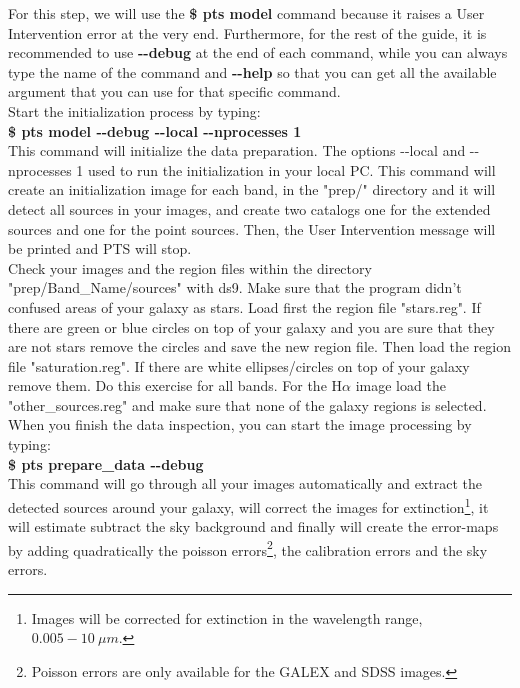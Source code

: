 \documentclass[15pt,a4paper,oneside,openright]{report}
\begin{document}
For this step, we will use the \textbf{\$ pts model} command because it raises a User Intervention error at the very end. Furthermore, for the rest of
the guide, it is recommended to use \textbf{-{}-debug} at the end of each command, while you can always type the name of the command and \textbf{-{}-help}
so that you can get all the available argument that you can use for that specific command.\\

Start the initialization process by typing:\\

\textbf{\$ pts model -{}-debug -{}-local -{}-nprocesses 1}\\

This command will initialize the data preparation. The options -{}-local and -{}-nprocesses 1 used to run the initialization in your local PC.
This command will create an initialization image for each band, in the "prep/" directory and it will detect all sources in your images, and create two catalogs one for the extended sources and one for the point sources. Then, the User Intervention message will be printed and PTS will stop.\\

Check your images and the region files within the directory "prep/Band\_Name/sources" with ds9. Make sure that the program didn't confused areas of your galaxy 
as stars. Load first the region file "stars.reg". If there are green or blue circles on top of your galaxy and you are sure that they are not stars remove 
the circles and save the new region file. Then load the region file "saturation.reg". If there are white ellipses/circles on top of your galaxy remove them. Do this exercise for all bands. For the H$\alpha$ image load the "other\_sources.reg" and make sure that none of the galaxy regions is selected.\\

When you finish the data inspection, you can start the image processing by typing:\\

\textbf{\$ pts prepare\_data -{}-debug}\\

This command will go through all your images automatically and extract the detected sources around your galaxy, will correct the images for extinction\footnote{Images will be corrected for extinction in the wavelength range, $0.005-10 \ \mu m$.}, it will estimate subtract the sky background and finally will create the error-maps 
by adding quadratically the poisson errors\footnote{Poisson errors are only available for the GALEX and SDSS images.}, the calibration errors and the sky errors.\\
\end{document}
